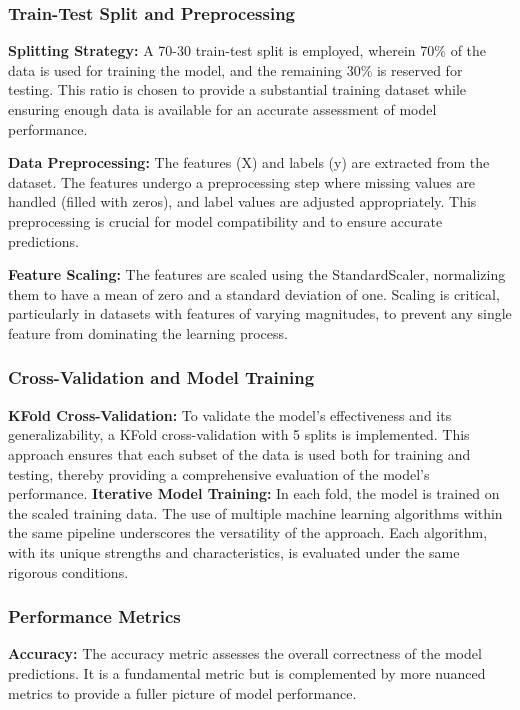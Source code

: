 \documentclass[12pt, a4paper,oneside]{book}
\numberwithin{equation}{section}
\begin{document}
\subsubsection{Train-Test Split and Preprocessing}
\textbf{Splitting Strategy:} A 70-30 train-test split is employed, wherein 70\% of the data is used for training the model, and the remaining 30\% is reserved for testing. This ratio is chosen to provide a substantial training dataset while ensuring enough data is available for an accurate assessment of model performance.

\textbf{Data Preprocessing:} The features (X) and labels (y) are extracted from the dataset. The features undergo a preprocessing step where missing values are handled (filled with zeros), and label values are adjusted appropriately. This preprocessing is crucial for model compatibility and to ensure accurate predictions.

\textbf{Feature Scaling:} The features are scaled using the StandardScaler, normalizing them to have a mean of zero and a standard deviation of one. Scaling is critical, particularly in datasets with features of varying magnitudes, to prevent any single feature from dominating the learning process.

\subsubsection{Cross-Validation and Model Training}
\textbf{KFold Cross-Validation:} To validate the model's effectiveness and its generalizability, a KFold cross-validation with 5 splits is implemented. This approach ensures that each subset of the data is used both for training and testing, thereby providing a comprehensive evaluation of the model's performance.
\textbf{Iterative Model Training:} In each fold, the model is trained on the scaled training data. The use of multiple machine learning algorithms within the same pipeline underscores the versatility of the approach. Each algorithm, with its unique strengths and characteristics, is evaluated under the same rigorous conditions.

\subsubsection{Performance Metrics}
\textbf{Accuracy:} The accuracy metric assesses the overall correctness of the model predictions. It is a fundamental metric but is complemented by more nuanced metrics to provide a fuller picture of model performance.
\end{document}
